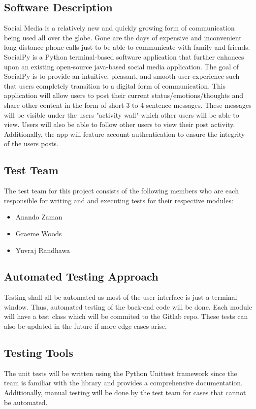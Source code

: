 \documentclass[12pt, titlepage]{article}
\begin{document}
\subsection{Software Description}
Social Media is a relatively new and quickly growing form of communication being used all over the globe. Gone are the days of expensive and inconvenient long-distance phone calls just to be able to communicate with family and friends. SocialPy is a Python terminal-based software application that further enhances upon an existing open-source java-based social media application. The goal of SocialPy is to provide an intuitive, pleasant, and smooth user-experience such that users completely transition to a digital form of communication. This application will allow users to post their current status/emotions/thoughts and share other content in the form of short 3 to 4 sentence messages. These messages will be visible under the users "activity wall" which other users will be able to view. Users will also be able to follow other users to view their post activity. Additionally, the app will feature account authentication to ensure the integrity of the users posts.

\subsection{Test Team}
The test team for this project consists of the following members who are each responsible for writing and and executing tests for their respective modules:
\begin{itemize}
    \item Anando Zaman
    \item Graeme Woods
    \item Yuvraj Randhawa
\end{itemize}

\subsection{Automated Testing Approach}
Testing shall all be automated as most of the user-interface is just a terminal window. Thus, automated testing of the back-end code will be done. Each module will have a test class which will be commited to the Gitlab repo. These tests can also be updated in the future if more edge cases arise.

\subsection{Testing Tools}
The unit tests will be written using the Python Unittest framework since the team is familiar with the library and provides a comprehensive documentation. Additionally, manual testing will be done by the test team for cases that cannot be automated.
\end{document}
